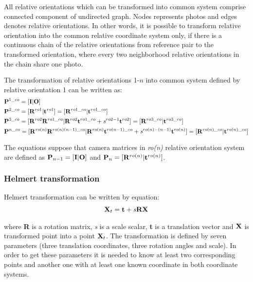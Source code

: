 \documentclass[a4paper,12pt]{article}
\newcommand{\ematr}[1]{%
{\bf #1}%
}
\newcommand{\evect}[1]{%
{\bf #1}%
}
\newcommand{\escal}[1]{%
{\it #1}%
}
\begin{document}

All relative orientations which can be transformed into common system comprise
 connected component of undirected graph.  Nodes represents  photos and edges denotes relative orientations. 
In other words, it is possible to transform relative orientation into the common relative coordinate system only, if there 
is a continuous chain of the relative orientations from reference pair 
to the transformed orientation, where every two neighborhood relative orientations in the chain share one photo.

The transformation of relative orientations 1-$n$ into common system defined by relative orientation 1 can be written as: 
\begin{equation}
\label{eq:comm_rel}
\begin{split}
&\ematr{P}^{1\_co} = [\ematr{I}|\evect{O}] \\
&\ematr{P}^{2\_co} = [\ematr{R}^{ro1}|\evect{t}^{ro1}] = [\ematr{R}^{ro1\_co}|\evect{t}^{ro1\_co}] \\
&\ematr{P}^{3\_co} = [\ematr{R}^{ro2} \ematr{R}^{ro1\_co}|\ematr{R}^{ro2} \evect{t}^{ro1\_co} + \escal{s}^{ro2-1} \evect{t}^{ro2}] 
=  [\ematr{R}^{ro3\_co} | \evect{t}^{ro3\_co}] \\
&\ematr{P}^{n\_co} = [\ematr{R}^{ro(n)} \ematr{R}^{ro(n)(n-1)\_co}|\ematr{R}^{ro(n)} \evect{t}^{ro(n-1)\_co} + \escal{s}^{ro(n)-(n-1)} \evect{t}^{ro(n)}] 
=  [\ematr{R}^{ro(n)\_co} | \evect{t}^{ro(n)\_co}] 
\end{split}
\end{equation}

The equations suppose that camera matrices in \escal{ro(n)} relative orientation system
are defined as $\ematr{P}_{n-1} = [\ematr{I}|\evect{O}]$ and $\ematr{P}_{n} = [\ematr{R}^{ro(n)}|\evect{t}^{ro(n)}]$.

\subsubsection{Helmert transformation}
\label{sec:helmert}

Helmert transformation can be written by equation:
\begin{equation}
\ematr{X}_{t} = \evect{t} + \escal{s}\ematr{R}\evect{X} \\
\end{equation}


where \ematr{R} is a rotation matrix, \escal{s} is a scale scalar, \evect{t} is a translation vector and
 $\evect{X}$ is transformed point into a point $\ematr{X}_{t}$.
The transformation is defined by seven parameters (three translation coordinates, three rotation angles and scale).
In order to get these parameters it is needed to know at least two corresponding points and  another one with 
at least one known coordinate in both coordinate systems. 
\end{document}
